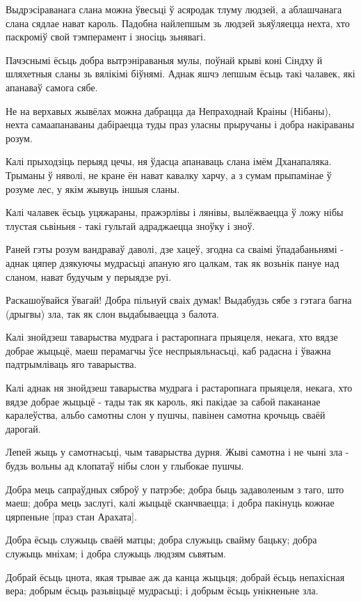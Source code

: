 \documentclass{article}
\begin{document}
Выдрэсіраванага слана можна ўвесьці ў асяродак тлуму людзей, а
аблашчанага слана сядлае нават кароль. Падобна найлепшым зь людзей
зьяўляецца нехта, хто паскроміў свой тэмперамент і зносіць зьнявагі.

Пачэснымі ёсьць добра вытрэніраваныя мулы, поўнай крыві коні Сіндху
й шляхетныя сланы зь вялікімі біўнямі. Аднак яшчэ лепшым ёсьць такі
чалавек, які апанаваў самога сябе.

Не на верхавых жывёлах можна дабрацца да Непраходнай Краіны
(Нібаны), нехта самаапанаваны дабіраецца туды праз уласны прыручаны і
добра накіраваны розум.

Калі прыходзіць перыяд цечы, ня ўдасца апанаваць слана імём
Дханапаляка. Трыманы ў няволі, не кране ён нават кавалку харчу, а з
сумам прыпамінае ў розуме лес, у якім жывуць іншыя сланы.

Калі чалавек ёсьць уцяжараны, пражэрлівы і лянівы, вылёжваецца ў
ложу нібы тлустая сьвіньня - такі гультай адраджаецца зноўку і зноў.

Раней гэты розум вандраваў даволі, дзе хацеў, згодна са сваімі
ўпадабаньнямі - аднак цяпер дзякуючы мудрасьці апаную яго цалкам, так як
возьнік пануе над сланом, нават будучым у перыядзе руі.

Раскашоўвайся ўвагай! Добра пільнуй сваіх думак! Выдабудзь сябе з
гэтага багна (дрыгвы) зла, так як слон выдабываецца з балота.

Калі знойдзеш таварыства мудрага і растаропнага прыяцеля, некага,
хто вядзе добрае жыцьцё, маеш перамагчы ўсе неспрыяльнасьці, каб радасна
і ўважна падтрымліваць яго таварыства.

Калі аднак ня знойдзеш таварыства мудрага і растаропнага прыяцеля,
некага, хто вядзе добрае жыцьцё - тады так як кароль, які пакідае за
сабой пакананае каралеўства, альбо самотны слон у пушчы, павінен самотна
крочыць сваёй дарогай.

Лепей жыць у самотнасьці, чым таварыства дурня. Жыві самотна і не
чыні зла - будзь вольны ад клопатаў нібы слон у глыбокае пушчы.

Добра мець сапраўдных сяброў у патрэбе; добра быць задаволеным з
таго, што маеш; добра мець заслугі, калі жыцьцё сканчваецца; і добра
пакінуць кожнае цярпеньне {[}праз стан Арахата{]}.

Добра ёсьць служыць сваёй матцы; добра служыць свайму бацьку; добра
служыць мніхам; і добра служыць людзям сьвятым.

Добрай ёсьць цнота, якая трывае аж да канца жыцьця; добрай ёсьць
непахісная вера; добрым ёсьць разьвіцьцё мудрасьці; і добрым ёсьць
унікненьне зла.
\end{document}
